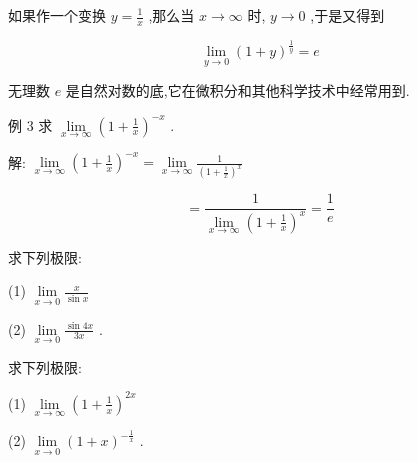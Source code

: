 \documentclass[lang=cn,newtx,10pt,scheme=chinese]{elegantbook}
\begin{document}
如果作一个变换 \(y = \frac{1}{x}\) ,那么当 \(x \rightarrow \infty\) 时, \(y \rightarrow 0\) ,于是又得到

\[
\mathop{\lim }\limits_{{y \rightarrow 0}}{\left( 1 + y\right) }^{\frac{1}{y}} = e
\]

无理数 \(e\) 是自然对数的底,它在微积分和其他科学技术中经常用到.

例 3 求 \(\mathop{\lim }\limits_{{x \rightarrow \infty }}{\left( 1 + \frac{1}{x}\right) }^{-x}\) .

解: \(\mathop{\lim }\limits_{{x \rightarrow \infty }}{\left( 1 + \frac{1}{x}\right) }^{-x} = \mathop{\lim }\limits_{{x \rightarrow \infty }}\frac{1}{{\left( 1 + \frac{1}{x}\right) }^{x}}\)

\[
= \frac{1}{\mathop{\lim }\limits_{{x \rightarrow \infty }}{\left( 1 + \frac{1}{x}\right) }^{x}} = \frac{1}{e}
\]

\begin{problemset}[练习]

\item 求下列极限:

(1) \(\mathop{\lim }\limits_{{x \rightarrow 0}}\frac{x}{\sin x}\) 

(2) \(\mathop{\lim }\limits_{{x \rightarrow 0}}\frac{\sin {4x}}{3x}\) .

\item 求下列极限:

(1) \(\mathop{\lim }\limits_{{x \rightarrow \infty }}{\left( 1 + \frac{1}{x}\right) }^{2x}\)

(2) \(\mathop{\lim }\limits_{{x \rightarrow 0}}{\left( 1 + x\right) }^{-\frac{1}{x}}\) .
\end{problemset}
\end{document}

